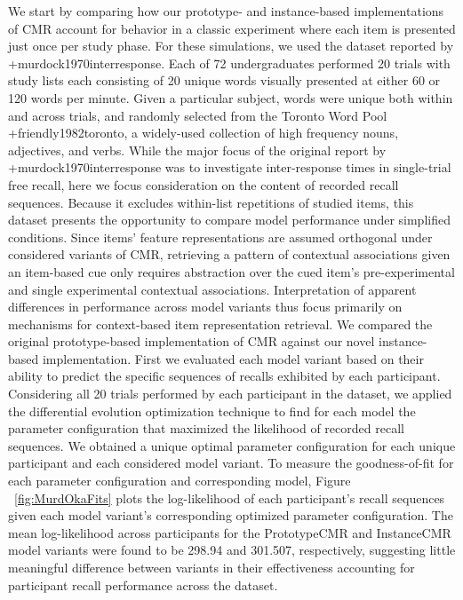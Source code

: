 We start by comparing how our prototype- and instance-based implementations of CMR account for behavior in a classic experiment where each item is presented just once per study phase. For these simulations, we used the dataset reported by +{}{}{murdock1970interresponse}. Each of 72 undergraduates performed 20 trials with study lists each consisting of 20 unique words visually presented at either 60 or 120 words per minute. Given a particular subject, words were unique both within and across trials, and randomly selected from the Toronto Word Pool +{}{}{friendly1982toronto}, a widely-used collection of high frequency nouns, adjectives, and verbs.\markdownRendererInterblockSeparator
{}While the major focus of the original report by +{}{}{murdock1970interresponse} was to investigate inter-response times in single-trial free recall, here we focus consideration on the content of recorded recall sequences. Because it excludes within-list repetitions of studied items, this dataset presents the opportunity to compare model performance under simplified conditions. Since items' feature representations are assumed orthogonal under considered variants of CMR, retrieving a pattern of contextual associations given an item-based cue only requires abstraction over the cued item's pre-experimental and single experimental contextual associations. Interpretation of apparent differences in performance across model variants thus focus primarily on mechanisms for context-based item representation retrieval.\markdownRendererInterblockSeparator
{}We compared the original prototype-based implementation of CMR against our novel instance-based implementation. First we evaluated each model variant based on their ability to predict the specific sequences of recalls exhibited by each participant. Considering all 20 trials performed by each participant in the dataset, we applied the differential evolution optimization technique to find for each model the parameter configuration that maximized the likelihood of recorded recall sequences. We obtained a unique optimal parameter configuration for each unique participant and each considered model variant. To measure the goodness-of-fit for each parameter configuration and corresponding model, Figure ~\ref{fig:MurdOkaFits} plots the log-likelihood of each participant's recall sequences given each model variant's corresponding optimized parameter configuration. The mean log-likelihood across participants for the PrototypeCMR and InstanceCMR model variants were found to be 298.94 and 301.507, respectively, suggesting little meaningful difference between variants in their effectiveness accounting for participant recall performance across the dataset.\markdownRendererInterblockSeparator
